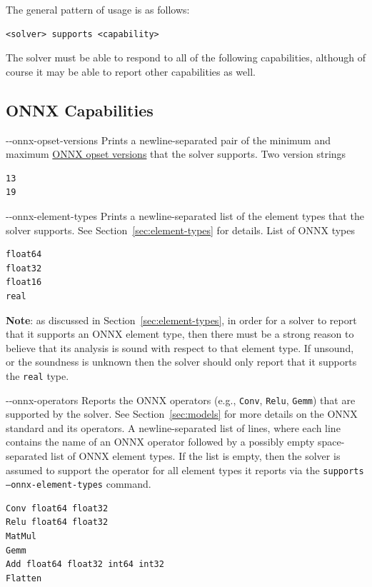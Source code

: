 The general pattern of usage is as follows:
\begin{lstlisting}[style=bash]
<solver> supports <capability>
\end{lstlisting}
The solver must be able to respond to all of the following capabilities, although of course it may be able to report other capabilities as well.

\subsection{ONNX Capabilities}
\label{sec:onnx-capabilities}

\clOutputOption
{{-}-onnx-opset-versions}
{Prints a newline-separated pair of the minimum and maximum \href{https://onnxruntime.ai/docs/reference/compatibility.html\#onnx-opset-support}{ONNX opset versions} that the solver supports.}
{Two version strings}
\begin{lstlisting}[style=bash]
%*\exampleSolver* supports --onnx-opset-versions
13
19
\end{lstlisting}

\clOutputOption
{{-}-onnx-element-types}
{Prints a newline-separated list of the element types that the solver supports. See Section~\ref{sec:element-types} for details.}
{List of ONNX types}
\begin{lstlisting}[style=bash]
%*\exampleSolver* supports --onnx-element-types
float64
float32
float16
real
\end{lstlisting}
\textbf{Note}: as discussed in Section~\ref{sec:element-types}, in order for a solver to report that it supports an ONNX element type, then there must be a strong reason to believe that its analysis is sound with respect to that element type. If unsound, or the soundness is unknown then the solver should only report that it supports the \texttt{real} type.

\clOutputOption
{{-}-onnx-operators}
{Reports the ONNX operators (e.g., \texttt{Conv}, \texttt{Relu}, \texttt{Gemm}) that are supported by the solver. See Section~\ref{sec:models} for more details on the ONNX standard and its operators. 
}
{A newline-separated list of lines, where each line contains the name of an ONNX operator followed by a possibly empty space-separated list of ONNX element types. If the list is empty, then the solver is assumed to support the operator for all element types it reports via the \texttt{supports --onnx-element-types} command.
}
\begin{lstlisting}[style=bash]
%*\exampleSolver* supports --onnx-operators
Conv float64 float32
Relu float64 float32
MatMul
Gemm
Add float64 float32 int64 int32
Flatten
\end{lstlisting}

